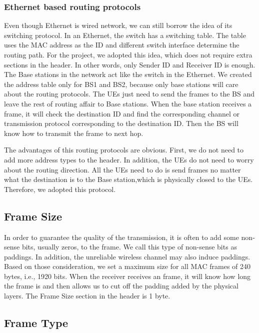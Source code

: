 \subsubsection{Ethernet based routing protocols}

Even though Ethernet is wired network, we can still borrow the idea of its switching protocol. In an Ethernet, the switch has a switching table. The table uses the MAC address as the ID and different switch interface determine the routing path. For the project, we adopted this idea, which does not require extra sections in the header. In other words, only Sender ID and Receiver ID is enough. The Base stations in the network act like the switch in the Ethernet. We created the address table only for BS1 and BS2, because only base stations will care about the routing protocols. The UEs just need to send the frames to the BS and leave the rest of routing affair to Base stations. When the base station receives a frame, it will check the destination ID and find the corresponding channel or transmission protocol corresponding to the destination ID. Then the BS will know how to transmit the frame to next hop. 

The advantages of this routing protocols are obvious. First, we do not need to add more address types to the header. In addition, the UEs do not need to worry about the routing direction. All the UEs need to do is send frames no matter what the destination is to the Base station,which is physically closed to the UEs.  Therefore, we adopted this protocol. 




\subsection{Frame Size}
In order to guarantee the quality of the transmission, it is often to add some non-sense bits, usually zeros, to the frame. We call this type of non-sense bits as paddings. In addition, the unreliable wireless channel may also induce paddings. Based on those consideration, we set a maximum size for all MAC frames of 240 bytes, i.e., 1920 bits. When the receiver receives an frame, it will know how long the frame is and then allows us to cut off the padding added by the physical layers.  The Frame Size section in the header is 1 byte. 


\subsection{Frame Type}

